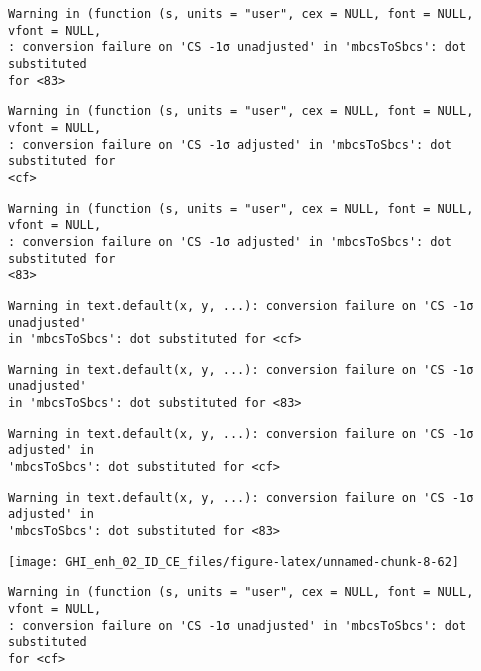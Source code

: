 \documentclass[
  10pt,
  a4paper,oneside]{article}
\begin{document}
\begin{verbatim}
Warning in (function (s, units = "user", cex = NULL, font = NULL, vfont = NULL,
: conversion failure on 'CS -1σ unadjusted' in 'mbcsToSbcs': dot substituted
for <83>
\end{verbatim}

\begin{verbatim}
Warning in (function (s, units = "user", cex = NULL, font = NULL, vfont = NULL,
: conversion failure on 'CS -1σ adjusted' in 'mbcsToSbcs': dot substituted for
<cf>
\end{verbatim}

\begin{verbatim}
Warning in (function (s, units = "user", cex = NULL, font = NULL, vfont = NULL,
: conversion failure on 'CS -1σ adjusted' in 'mbcsToSbcs': dot substituted for
<83>
\end{verbatim}

\begin{verbatim}
Warning in text.default(x, y, ...): conversion failure on 'CS -1σ unadjusted'
in 'mbcsToSbcs': dot substituted for <cf>
\end{verbatim}

\begin{verbatim}
Warning in text.default(x, y, ...): conversion failure on 'CS -1σ unadjusted'
in 'mbcsToSbcs': dot substituted for <83>
\end{verbatim}

\begin{verbatim}
Warning in text.default(x, y, ...): conversion failure on 'CS -1σ adjusted' in
'mbcsToSbcs': dot substituted for <cf>
\end{verbatim}

\begin{verbatim}
Warning in text.default(x, y, ...): conversion failure on 'CS -1σ adjusted' in
'mbcsToSbcs': dot substituted for <83>
\end{verbatim}

\begin{center}\texttt{[image: GHI\_enh\_02\_ID\_CE\_files/figure-latex/unnamed-chunk-8-62]} \end{center}

\begin{verbatim}
Warning in (function (s, units = "user", cex = NULL, font = NULL, vfont = NULL,
: conversion failure on 'CS -1σ unadjusted' in 'mbcsToSbcs': dot substituted
for <cf>
\end{verbatim}
\end{document}

